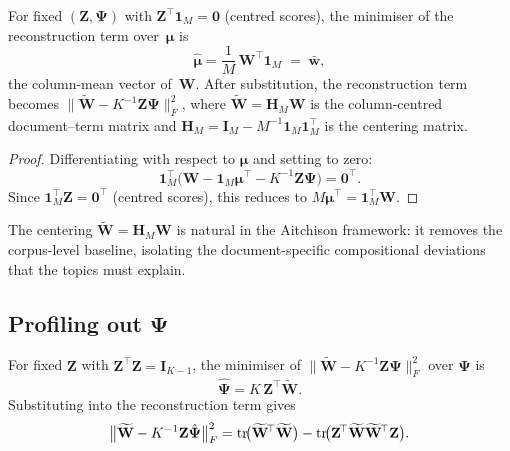 \begin{proposition}
\label{prop:mu_profile}
For fixed $(\mathbf{Z},\boldsymbol{\Psi})$ with
$\mathbf{Z}^{\!\top}\mathbf{1}_M = \mathbf{0}$ (centred scores), the
minimiser of the reconstruction term
over~$\boldsymbol{\mu}$ is
\begin{equation}
  \hat{\boldsymbol{\mu}}
  = \frac{1}{M}\,\mathbf{W}^{\!\top}\mathbf{1}_M
  \;=\; \bar{\mathbf{w}},
  \label{eq:mu_hat}
\end{equation}
the column-mean vector of~$\mathbf{W}$.
After substitution, the reconstruction term becomes
$\|\widetilde{\mathbf{W}} - K^{-1}\mathbf{Z}\boldsymbol{\Psi}\|_F^2$,
where $\widetilde{\mathbf{W}} = \mathbf{H}_M\mathbf{W}$ is the
column-centred document--term matrix and
$\mathbf{H}_M = \mathbf{I}_M - M^{-1}\mathbf{1}_M\mathbf{1}_M^{\!\top}$
is the centering matrix.
\end{proposition}

\begin{proof}
Differentiating with respect to $\boldsymbol{\mu}$ and setting to zero:
\[
  \mathbf{1}_M^{\!\top}
  \bigl(\mathbf{W} - \mathbf{1}_M\boldsymbol{\mu}^{\!\top}
        - K^{-1}\mathbf{Z}\boldsymbol{\Psi}\bigr) = \mathbf{0}^{\!\top}.
\]
Since $\mathbf{1}_M^{\!\top}\mathbf{Z}=\mathbf{0}^{\!\top}$ (centred
scores), this reduces to
$M\boldsymbol{\mu}^{\!\top}
 = \mathbf{1}_M^{\!\top}\mathbf{W}$.
\end{proof}

\noindent
The centering $\widetilde{\mathbf{W}} = \mathbf{H}_M\mathbf{W}$ is
natural in the Aitchison framework: it removes the corpus-level baseline,
isolating the document-specific compositional deviations that the topics
must explain.

\subsection{Profiling out
\texorpdfstring{$\boldsymbol{\Psi}$}{Psi}}
\label{subsec:profile_Psi}

\begin{proposition}
\label{prop:Psi_profile}
For fixed $\mathbf{Z}$ with
$\mathbf{Z}^{\!\top}\mathbf{Z}=\mathbf{I}_{K-1}$, the minimiser of
$\|\widetilde{\mathbf{W}} - K^{-1}\mathbf{Z}\boldsymbol{\Psi}\|_F^2$
over $\boldsymbol{\Psi}$ is
\begin{equation}
  \hat{\boldsymbol{\Psi}}
  = K\,\mathbf{Z}^{\!\top}\widetilde{\mathbf{W}}.
  \label{eq:Psi_hat}
\end{equation}
Substituting into the reconstruction term gives
\begin{equation}
  \bigl\|\widetilde{\mathbf{W}}
    - K^{-1}\mathbf{Z}\hat{\boldsymbol{\Psi}}\bigr\|_F^2
  = \operatorname{tr}\!\bigl(\widetilde{\mathbf{W}}^{\!\top}\widetilde{\mathbf{W}}\bigr)
    - \operatorname{tr}\!\bigl(
        \mathbf{Z}^{\!\top}
        \widetilde{\mathbf{W}}\widetilde{\mathbf{W}}^{\!\top}
        \mathbf{Z}
      \bigr).
  \label{eq:recon_profiled}
\end{equation}
\end{proposition}

